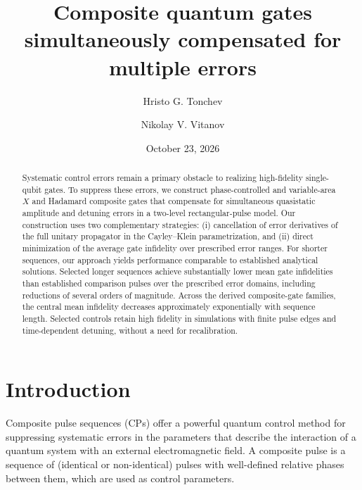 \documentclass[10pt,aps,twocolumn,pra,floatfix,superscriptaddress]{revtex4-2}
\begin{document}
\title{Composite quantum gates simultaneously compensated for multiple errors}

\author{Hristo G. Tonchev}

\author{Nikolay V. Vitanov}

\date{October 23, 2026}

\begin{abstract}
Systematic control errors remain a primary obstacle to realizing high-fidelity single-qubit gates. To suppress these errors, we construct phase-controlled and variable-area $X$ and Hadamard composite gates that compensate for simultaneous quasistatic amplitude and detuning errors in a two-level rectangular-pulse model. Our construction uses two complementary strategies: (i) cancellation of error derivatives of the full unitary propagator in the Cayley–Klein parametrization, and (ii) direct minimization of the average gate infidelity over prescribed error ranges. For shorter sequences, our approach yields performance comparable to established analytical solutions. Selected longer sequences achieve substantially lower mean
gate infidelities than established comparison pulses over
the prescribed error domains, including reductions of
several orders of magnitude. Across the derived composite-gate families, the central mean infidelity decreases approximately exponentially with sequence length. Selected controls retain high fidelity in simulations with finite pulse edges and time-dependent detuning, without a need for recalibration.

\end{abstract}

\maketitle

\section{Introduction}

Composite pulse sequences (CPs) \cite{PhysRevLett.113.043001,arbitraryCp,Brown_2004,Transmon_CP,counsell1985analytical} offer a powerful quantum control method \cite{qc1,qc2,dong2010quantum,d2021introduction,chernev2026universalcompositephasegates} for suppressing systematic errors in the parameters that describe the interaction of a quantum system with an external electromagnetic field.
A composite pulse is a sequence of (identical or non-identical) pulses with well-defined relative phases between them, which are used as control parameters.
\end{document}

